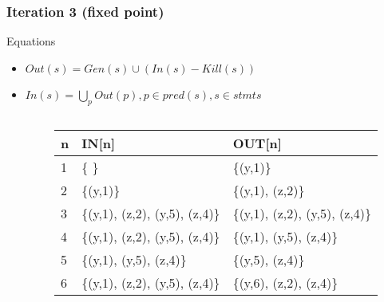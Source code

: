 \begin{frame}[fragile, t]
	\frametitle{Iteration 3 (fixed point)} 
	
	\begin{center}
		\begin{scriptsize}
			\begin{minipage}{8cm}
				\begin{block}{Equations}
					\begin{itemize}
						\item $Out(s) = Gen(s) \cup (In(s) - Kill(s))$  
						\item $In(s) = \bigcup_p Out(p), p \in pred(s), s \in stmts$
					\end{itemize}
				\end{block}
			\end{minipage}
		\end{scriptsize}
	\end{center}
	
	\begin{columns}[T]
		\begin{column}[T]{.3\textwidth}
			\vspace{0pt}
			
		\end{column}
		\begin{column}[T]{.7\textwidth}
			\vspace{0pt}    
			\begin{scriptsize}
				\begin{table}[]
					\begin{tabular}{|l|l|l|}
						\hline
						n & IN{[}n{]} & OUT{[}n{]} \\ \hline
						1  & \{ \} & \{(y,1)\} \pause \\ \hline
						2  & \{(y,1)\} & \{(y,1), (z,2)\} \pause \\ \hline
						3  & \{(y,1), (z,2), (y,5), (z,4)\} & \{(y,1), (z,2), (y,5), (z,4)\} \pause \\ \hline
						4  & \{(y,1), (z,2), (y,5), (z,4)\} & \{(y,1), (y,5), (z,4)\} \pause \\ \hline
						5  & \{(y,1), (y,5), (z,4)\} & \{(y,5), (z,4)\} \pause \\ \hline
						6  & \{(y,1), (z,2), (y,5), (z,4)\} & \{(y,6), (z,2), (z,4)\} \\ \hline
					\end{tabular}
				\end{table}   
			\end{scriptsize}
		\end{column}
		
	\end{columns}
	
\end{frame}   